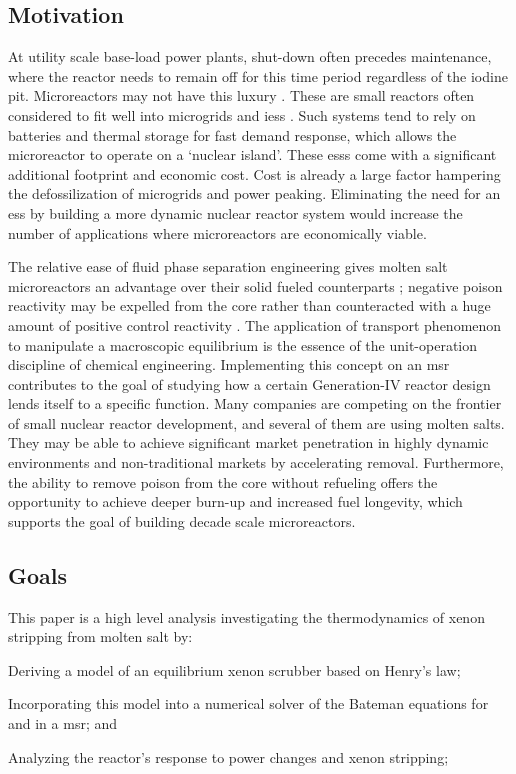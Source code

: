 \subsection{Motivation}
At utility scale base-load power plants, shut-down often precedes maintenance, where the reactor needs to remain off for this time period regardless of the iodine pit. Microreactors may not have this luxury \cite{micro}. These are small reactors often considered to fit well into microgrids \cite{BikashMicro} and \acfp{ies} \cite{AmeyIES}. Such systems tend to rely on batteries and thermal storage for fast demand response, which allows the microreactor to operate on a `nuclear island'. These \acfp{ess} come with a significant additional footprint and economic cost. Cost is already a large factor hampering the defossilization of microgrids and power peaking. Eliminating the need for an \acs{ess} by building a more dynamic nuclear reactor system would increase the number of applications where microreactors are economically viable.
 
The relative ease of fluid phase separation engineering gives molten salt microreactors an advantage over their solid fueled counterparts \cite{CarterPHD,PetersonMS}; negative poison reactivity may be expelled from the core rather than counteracted with a huge amount of positive control reactivity \cite{ORNL-xenonbehavior}. The application of transport phenomenon to manipulate a macroscopic equilibrium is the essence of the unit-operation discipline of chemical engineering. Implementing this concept on an \acs{msr} contributes to the goal of studying how a certain Generation-IV reactor design lends itself to a specific function. Many companies are competing on the frontier of small nuclear reactor development, and several of them are using molten salts. They may be able to achieve significant market penetration in highly dynamic environments and non-traditional markets by accelerating \Xe removal. Furthermore, the ability to remove poison from the core without refueling offers the opportunity to achieve deeper burn-up and increased fuel longevity, which supports the goal of building decade scale microreactors. 

\subsection{Goals}
This paper is a high level analysis investigating the thermodynamics of xenon stripping from molten salt by:
\begin{enumerate*}[topsep=3pt,itemsep=-0.75ex,partopsep=1ex,parsep=1ex,label=(\arabic*)]
    \item Deriving a model of an equilibrium xenon scrubber based on Henry's law;
    \item Incorporating this model into a numerical solver of the Bateman equations for \I and \Xe in a \acs{msr}; and 
    \item Analyzing the reactor's response to power changes and xenon stripping; 
\end{enumerate*}

